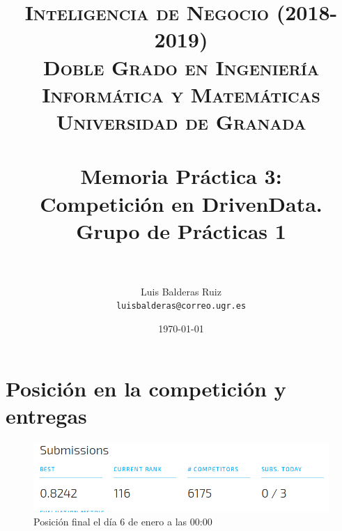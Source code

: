 
\usepackage{graphicx}
\graphicspath{ {./imgs/} }


\title{	
	\normalfont \normalsize 
	\textsc{\textbf{Inteligencia de Negocio (2018-2019)} \\ Doble Grado en Ingeniería Informática y Matemáticas \\ Universidad de Granada} \\ [25pt] %
	\horrule{0.5pt} \\[0.4cm] %
	\huge Memoria Práctica 3: \\ Competición en DrivenData. Grupo de Prácticas 1 \\ %
	\horrule{2pt} \\[0.5cm] %
}

\author{Luis Balderas Ruiz \\ \texttt{luisbalderas@correo.ugr.es}} 

\date{\normalsize\today} %



	
\maketitle %
	
\newpage %

\section{Posición en la competición y entregas}	

\begin{figure}[H] %
	\centering
	\includegraphics[scale=0.5]{rank.png}  %
	\caption{Posición final el día 6 de enero a las 00:00} 
	\label{fig:rank}
\end{figure}
	
